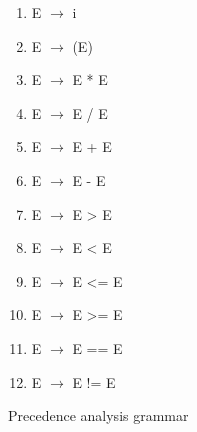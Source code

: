 \documentclass[a4paper, 11pt]{article}
\begin{document}
\begin{figure}[ht]
    \begin{center}
    \begin{enumerate}
    
        
        \item E $\to$ i
        \item E $\to$ (E)
        \item E $\to$ E * E
        \item E $\to$ E / E
        \item E $\to$ E + E
        \item E $\to$ E - E
        \item E $\to$ E > E
        \item E $\to$ E < E
        \item E $\to$ E <= E
        \item E $\to$ E >= E
        \item E $\to$ E == E
        \item E $\to$ E != E
        
    \end{enumerate}
    \caption{Precedence analysis grammar}
    \label{Precedence_grammar}
\end{center}
\end{figure}
\end{document}
